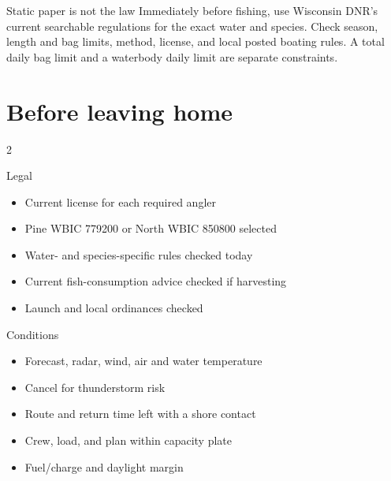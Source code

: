


\begin{teloshazard}{Static paper is not the law}
Immediately before fishing, use Wisconsin DNR's current searchable regulations
for the exact water and species. Check season, length and bag limits, method,
license, and local posted boating rules. A total daily bag limit and a
waterbody daily limit are separate constraints.
\end{teloshazard}

\section{Before leaving home}
\begin{multicols}{2}
\begin{gate}{Legal}
\begin{itemize}
\item Current license for each required angler
\item Pine WBIC 779200 or North WBIC 850800 selected
\item Water- and species-specific rules checked today
\item Current fish-consumption advice checked if harvesting
\item Launch and local ordinances checked
\end{itemize}
\end{gate}
\columnbreak
\begin{gate}{Conditions}
\begin{itemize}
\item Forecast, radar, wind, air and water temperature
\item Cancel for thunderstorm risk
\item Route and return time left with a shore contact
\item Crew, load, and plan within capacity plate
\item Fuel/charge and daylight margin
\end{itemize}
\end{gate}
\end{multicols}

